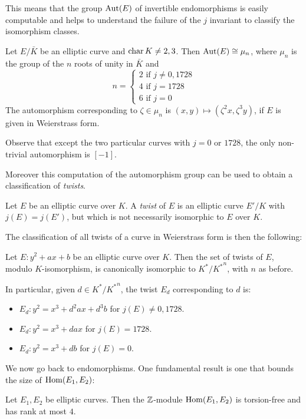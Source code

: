 This means that the group $\operatorname{Aut}(E)$ of invertible endomorphisms is easily computable and helps to understand the failure of the $j$ invariant to classify the isomorphism classes.

\begin{theorem}
    Let $E/\bar K$ be an elliptic curve and $\operatorname{char} K\neq 2,3$. Then $\operatorname{Aut}(E)\cong\mu_n$, where $\mu_n$ is the group of the $n$ roots of unity in $\bar K$ and 
    $$n=\begin{cases}2\text{ if } j\neq0,1728\\ 4 \text{ if } j=1728\\ 6 \text{ if } j=0\end{cases}$$
    The automorphism corresponding to $\zeta\in\mu_n$ is $(x,y)\mapsto(\zeta^2x,\zeta^3y)$, if $E$ is given in Weierstrass form.
\end{theorem}

Observe that except the two particular curves with $j=0$ or $1728$, the only non-trivial automorphism is $[-1]$.

Moreover this computation of the automorphism group can be used to obtain a classification of \emph{twists}.

\begin{definition}
    Let $E$ be an elliptic curve over $K$. A \emph{twist} of $E$ is an elliptic curve $E'/K$ with $j(E)=j(E')$, but which is not necessarily isomorphic to $E$ over $K$.
\end{definition}

The classification of all twists of a curve in Weierstrass form is then the following:
\begin{proposition}
    Let $E:y^2+ax+b$ be an elliptic curve over $K$. Then the set of twists of $E$, modulo $K$-isomorphism, is canonically isomorphic to $K^\ast/{K^\ast}^n$, with $n$ as before.
    
    In particular, given $d\in K^\ast/{K^\ast}^n$, the twist $E_d$ corresponding to $d$ is:
    \begin{itemize}
        \item $E_d: y^2=x^3+d^2ax+d^3b$ for $j(E)\neq0,1728$.
        \item $E_d: y^2=x^3+dax$ for $j(E)=1728$.
        \item $E_d: y^2=x^3+db$ for $j(E)=0$.
    \end{itemize}
\end{proposition}

We now go back to endomorphisms. One fundamental result is one that bounds the size of $\operatorname{Hom}(E_1,E_2)$:
\begin{proposition}
    Let $E_1,E_2$ be elliptic curves. Then the $\mathbb{Z}$-module $\operatorname{Hom}(E_1,E_2)$ is torsion-free and has rank at most $4$.
\end{proposition}

